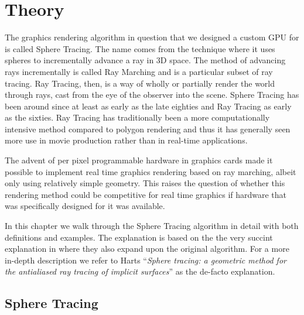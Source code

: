 \chapter{Theory}


	The graphics rendering algorithm in question that we designed a custom GPU
	for is called Sphere Tracing\cite{Hart1996}. The name comes from the
	technique where it uses spheres to incrementally advance a ray in 3D space.
	The method of advancing rays incrementally is called Ray Marching and is a
	particular subset of ray tracing\cite{Whitted1980}. Ray Tracing, then, is a
	way of wholly or partially render the world through rays, cast from the eye
	of the observer into the scene. Sphere Tracing has been around since at least
	as early as the late eighties\cite{Hart1989} and Ray Tracing as early as the
	sixties\cite{Appel1968}. Ray Tracing has traditionally been a more
	computationally intensive method compared to polygon
	rendering\cite{Wylie1967} and thus it has generally seen more use in movie
	production rather than in real-time applications.\cite{ref_needed?} 

	The advent of per pixel programmable hardware in graphics cards made it 
	possible to implement real time graphics rendering based on ray	marching, 
	albeit only using relatively simple geometry. This raises the question of 
	whether this rendering method could be competitive for real time graphics 
	if hardware that was specifically designed for it was available.

	In this chapter we walk through the Sphere Tracing algorithm in detail with
	both definitions and examples. The explanation is based on the the very
	succint explanation in \cite{Korndorfer2014} where they also expand upon the
	original algorithm. For a more in-depth description we refer to Harts
	“\emph{Sphere tracing: a geometric method for the antialiased ray tracing
	of implicit surfaces}”\cite{Hart1996} as the de-facto explanation.


	\section{Sphere Tracing} 

